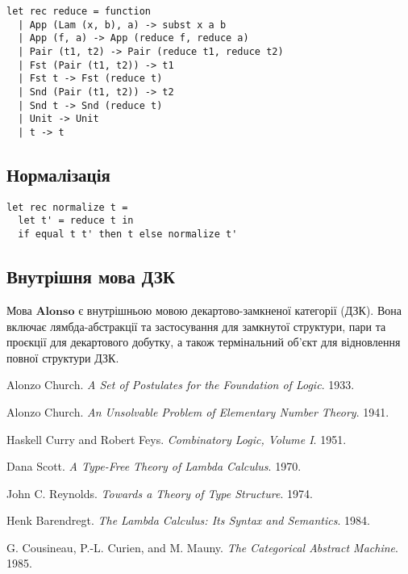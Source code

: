 \documentclass{article}
\theoremstyle{definition}
\begin{document}
\begin{lstlisting}[mathescape=true]
let rec reduce = function
  | App (Lam (x, b), a) -> subst x a b
  | App (f, a) -> App (reduce f, reduce a)
  | Pair (t1, t2) -> Pair (reduce t1, reduce t2)
  | Fst (Pair (t1, t2)) -> t1
  | Fst t -> Fst (reduce t)
  | Snd (Pair (t1, t2)) -> t2
  | Snd t -> Snd (reduce t)
  | Unit -> Unit
  | t -> t
\end{lstlisting}

\subsection{Нормалізація}

\begin{lstlisting}[mathescape=true]
let rec normalize t =
  let t' = reduce t in
  if equal t t' then t else normalize t'
\end{lstlisting}

\subsection{Внутрішня мова ДЗК}

Мова $\mathbf{Alonso}$ є внутрішньою мовою декартово-замкненої категорії (ДЗК).
Вона включає лямбда-абстракції та застосування для замкнутої структури,
пари та проєкції для декартового добутку, а також термінальний об’єкт для
відновлення повної структури ДЗК.


\begin{thebibliography}{9}

Alonzo Church.
\textit{A Set of Postulates for the Foundation of Logic}.
1933.

Alonzo Church.
\textit{An Unsolvable Problem of Elementary Number Theory}.
1941.

Haskell Curry and Robert Feys.
\textit{Combinatory Logic, Volume I}.
1951.

Dana Scott.
\textit{A Type-Free Theory of Lambda Calculus}.
1970.

John C. Reynolds.
\textit{Towards a Theory of Type Structure}.
1974.

Henk Barendregt.
\textit{The Lambda Calculus: Its Syntax and Semantics}.
1984.

G. Cousineau, P.-L. Curien, and M. Mauny.
\textit{The Categorical Abstract Machine}.
1985.

\end{thebibliography}
\end{document}
